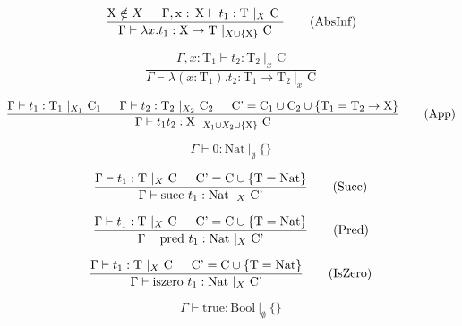 \documentclass{article}
\begin{document}
\begin{equation}
    \frac{\text{X} \notin X \indent \Gamma,\text{x : X} \vdash t_{1}:\text{T } |_{X} \text{ C }}
    {\Gamma \vdash \lambda x.t_{1} : \text{X} \to \text{T } |_{X \cup \{\text{X}\}} \ \text{C}}
    \tag{AbsInf}
\end{equation}

\begin{equation}
    \frac{\Gamma, x : \text{T}_{1} \vdash t_{2} : \text{T}_{2} \ |_{x} \text{ C} }
    {\Gamma \vdash \lambda(x : \text{T}_{1}).t_{2} : \text{T}_{1} \to \text{T}_{2} \ |_{x} \text{ C}}
    \tag{Abs}
\end{equation}

\begin{equation}
    \frac{\Gamma \vdash t_{1} : \text{T}_{1} \ |_{X_{1}} \ \text{C}_{1} \indent \Gamma \vdash t_{2} : \text{T}_{2} \ |_{X_{2}} \ \text{C}_{2} \indent \text{C'} = \text{C}_{1} \cup \text{C}_{2} \cup \{ \text{T}_{1} = \text{T}_{2} \to \text{X}\}}
    {\Gamma \vdash t_{1} t_{2} : \text{X} \ |_{X_{1} \cup X_{2} \cup \{ \text{X}\}} \ \text{C} }
    \tag{App}
\end{equation}

\begin{equation}
    \Gamma \vdash 0 : \text{Nat} \ |_{\emptyset} \ \{\}
    \tag{Zero}
\end{equation}

\begin{equation}
    \frac{\Gamma \vdash t_{1} : \text{T} \ |_{X} \ \text{C} \indent \text{C'} = \text{C} \cup \{\text{T} = \text{Nat}\}}
    {\Gamma \vdash \text{succ} \ t_{1} : \text{Nat} \ |_{X} \ \text{C'} }
    \tag{Succ}
\end{equation}

\begin{equation}
    \frac{\Gamma \vdash t_{1} : \text{T} \ |_{X} \ \text{C} \indent \text{C'} = \text{C} \cup \{\text{T} = \text{Nat}\}}
    {\Gamma \vdash \text{pred} \ t_{1} : \text{Nat} \ |_{X} \ \text{C'} }
    \tag{Pred}
\end{equation}

\begin{equation}
    \frac{\Gamma \vdash t_{1} : \text{T} \ |_{X} \ \text{C} \indent \text{C'} = \text{C} \cup \{\text{T} = \text{Nat}\}}
    {\Gamma \vdash \text{iszero} \ t_{1} : \text{Nat} \ |_{X} \ \text{C'} }
    \tag{IsZero}
\end{equation}

\begin{equation}
    \Gamma \vdash \text{true} : \text{Bool} \ |_{\emptyset} \ \{\}
    \tag{True}
\end{equation}
\end{document}
